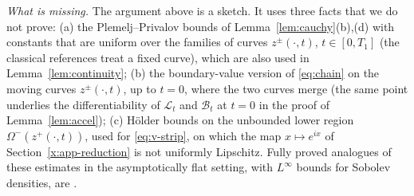 \emph{What is missing.} The argument above is a sketch. It uses three facts that we do not prove: (a) the Plemelj--Privalov bounds of Lemma~\ref{lem:cauchy}(b),(d) with constants that are
uniform over the families of curves $z^\pm(\cdot,t)$, $t\in[0,T_1]$ (the classical references treat a fixed curve), which are also used in Lemma~\ref{lem:continuity}; (b) the boundary-value
version of \eqref{eq:chain} on the moving curves $z^\pm(\cdot,t)$, up to $t=0$, where the two curves merge (the same point underlies the differentiability of $\mathcal L_t$ and $\mathcal B_t$ at
$t=0$ in the proof of Lemma~\ref{lem:accel}); (c) H\"older bounds on the unbounded lower region $\Omega^-(z^+(\cdot,t))$, used for \eqref{eq:v-strip}, on which the map $x\mapsto e^{ix}$ of
Section~\ref{x:app-reduction} is not uniformly Lipschitz. Fully proved analogues of these estimates in the asymptotically flat setting, with $L^\infty$ bounds for Sobolev densities, are
\cite[Lemmas~8.4--8.5]{LM26}.
